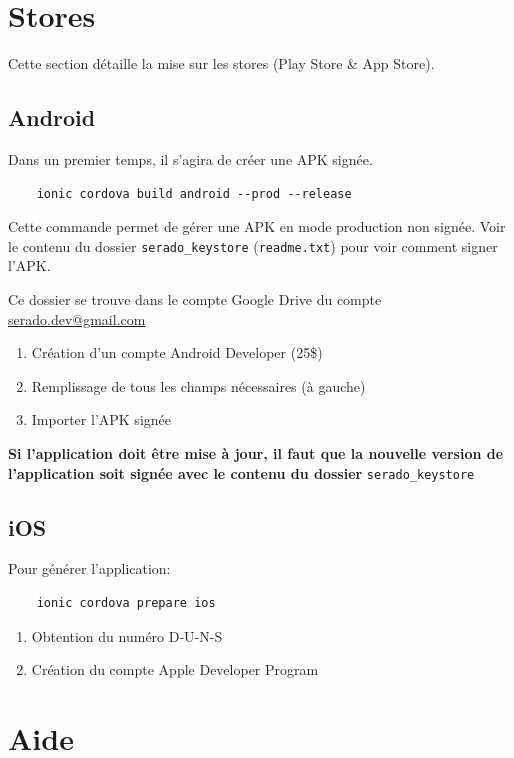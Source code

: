 \documentclass[french]{report}
\begin{document}
\section{Stores}
Cette section détaille la mise sur les stores (Play Store \& App Store).

\subsection{Android} \label{sec:android}
Dans un premier temps, il s'agira de créer une APK signée.
\begin{verbatim}
    ionic cordova build android --prod --release
\end{verbatim}
Cette commande permet de gérer une APK en mode production non signée. Voir le contenu du dossier
\verb|serado_keystore| (\verb|readme.txt|) pour voir comment signer l'APK.

Ce dossier se trouve dans le compte Google Drive du compte
\url{serado.dev@gmail.com}

\begin{enumerate}
    \item Création d'un compte Android Developer (25\$)
    \item Remplissage de tous les champs nécessaires (à gauche)\label{all_fileds}
    \item Importer l'APK signée
\end{enumerate}

\textbf{Si l'application doit être mise à jour, il faut que la nouvelle version de
l'application soit signée avec le contenu du dossier} \verb|serado_keystore|

\subsection{iOS}
Pour générer l'application:
\begin{verbatim}
    ionic cordova prepare ios
\end{verbatim}

\begin{enumerate}
    \item Obtention du numéro D-U-N-S
    \item Création du compte Apple Developer Program
\end{enumerate}

\section{Aide}
\end{document}
